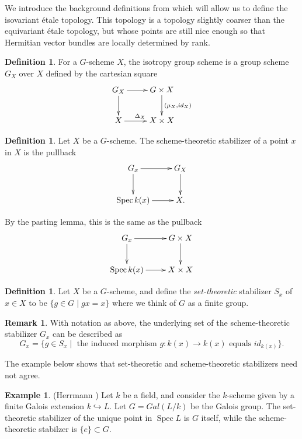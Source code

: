 \documentclass[edeposit,fullpage]{uiucthesis2009}
\DeclareMathOperator{\Spec}{Spec}
\theoremstyle{plain}
\numberwithin{lemma}{section}
\theoremstyle{definition}
\newtheorem{example}[lemma]{Example}
\newtheorem{definition}[lemma]{Definition}
\newtheorem{remark}[lemma]{Remark}
\begin{document}
We introduce the background definitions from \cite{GrpSchHell} which
will allow us to define the isovariant \'etale topology. This topology
is a topology slightly coarser than the equivariant \'etale topology,
but whose points are still nice enough so that Hermitian vector
bundles are locally determined by rank. 

\begin{definition}
For a $G$-scheme $X$, the isotropy group scheme is a group scheme
$G_X$ over $X$ defined by the cartesian square
\[
\xymatrix{G_X \ar[r] \ar[d] & G \times X \ar[d]^{(\mu_X,id_X)} \\ X
  \ar[r]^{\Delta_X} & X \times X}
\]
\end{definition}

\begin{definition}
Let $X$ be a $G$-scheme. The scheme-theoretic stabilizer of a point
$x$ in $X$ is the pullback
\[
\xymatrix{G_x \ar[r] \ar[d] & G_X \ar[d]\\ \Spec k(x) \ar[r] & X.}
\]

By the pasting lemma, this is the same as the pullback
\[
\xymatrix{G_x \ar[r] \ar[d] & G \times X \ar[d]\\ \Spec k(x) \ar[r] &
  X \times X}
\]
\end{definition}

\begin{definition}
Let $X$ be a $G$-scheme, and define the \emph{set-theoretic}
stabilizer $S_x$ of $x \in X$ to be $\{g \in G
\mid gx = x\}$ where we think of $G$ as a finite group. 
\end{definition}

\begin{remark}
With notation as above, the underlying set of the scheme-theoretic
stabilizer $G_x$ can be described as
\[
G_x = \{g \in S_x \mid \text{ the induced morphism $g : k(x)
  \rightarrow k(x)$ equals } id_{k(x)}\}.
\]
\end{remark}



The example below shows that set-theoretic and scheme-theoretic
stabilizers need not agree.

\begin{example} (Herrmann \cite{GrpSchHerr})
Let $k$ be a field, and consider the $k$-scheme given by a finite
Galois extension $k \hookrightarrow L$. Let $G = Gal(L/k)$ be the
Galois group. The set-theoretic stabilizer of the unique point in
$\Spec L$ is $G$ itself, while the scheme-theoretic stabilzer is
$\{e\} \subset G$. 
\end{example}
\end{document}
